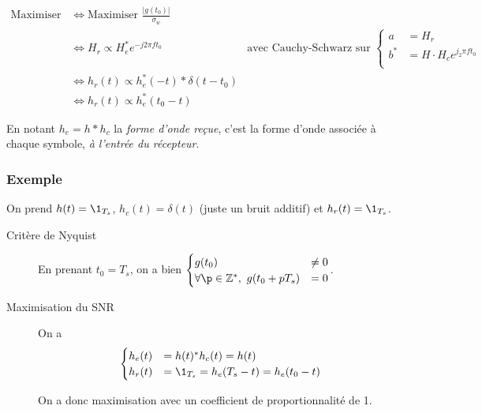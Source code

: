 \documentclass{article}
\begin{document}
\begin{align*}
    \text{Maximiser SNR} &\iff \text{Maximiser $\frac{|g(t_0)|}{\sigma_w}$} \\
                         &\iff H_r \propto H_e^\ast e^{-j2 \pi ft_0} \quad&\text{avec Cauchy-Schwarz sur $\begin{cases}
                                 a &= H_r \\
                                 b^\ast &= H \cdot H_c e^{j_2 \pi ft_0} \\
                         \end{cases}$} \\
                         &\iff h_r(t) \propto h_e^\ast(-t)  \ast  \delta (t-t_0) \\
                         &\iff h_r(t) \propto h_e^\ast(t_0-t)
\end{align*}

En notant $h_e = h \ast h_c$ la \emph{forme d'onde reçue}, c'est la forme d'onde associée à chaque symbole, \emph{à l'entrée du récepteur}.

\subsubsection{Exemple}

On prend $h(t) = \1_{T_s}$, $h_c(t) = \delta(t)$ (juste un bruit additif) et  $h_r(t) = \1_{T_s}$.

\begin{description}
    \item[Critère de Nyquist] En prenant $t_0 = T_s$, on a bien $\begin{cases}
            g(t_0) &\neq 0 \\
            \forall \p\in \Z^\ast,\  g(t_0 + pT_s) &= 0 \\
    \end{cases}$.

    \item[Maximisation du SNR] 

        On a \begin{align*}
            \begin{cases}
                h_e(t) &= h(t) ^\ast h_c(t) = h(t) \\
                h_r(t) &= \1_{T_s} = h_e(T_s - t) = h_e(t_0-t) \\
            \end{cases}
        \end{align*}

        On a donc maximisation avec un coefficient de proportionnalité de 1.
\end{description}
\end{document}
